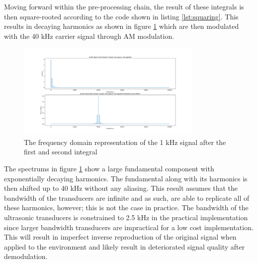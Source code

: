Moving forward within the pre-processing chain, the result of these integrals is then square-rooted according to the code shown in listing \ref{lst:squaring}. This results in decaying harmonics as shown in figure \ref{fig:sqrtsimmodfft} which are then modulated with the 40 kHz carrier signal through AM modulation.
\begin{figure}[ht!]
    \centering
    \includegraphics[width=0.8\textwidth]{Figures/SigSimulation/sqrt_sqrtmodfft.png}
    \caption{The frequency domain representation of the 1 kHz signal after the first and second integral}
    \label{fig:sqrtsimmodfft}
\end{figure}
The spectrums in figure \ref{fig:sqrtsimmodfft} show a large fundamental component with exponentially decaying harmonics. The fundamental along with its harmonics is then shifted up to 40 kHz without any aliasing. This result assumes that the bandwidth of the transducers are infinite and as such, are able to replicate all of these harmonics, however; this is not the case in practice. The bandwidth of the ultrasonic transducers is constrained to 2.5 kHz in the practical implementation since larger bandwidth transducers are impractical for a low cost implementation. This will result in imperfect inverse reproduction of the original signal when applied to the environment and likely result in deteriorated signal quality after demodulation.
\newpage
